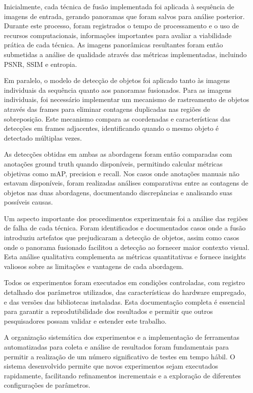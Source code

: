 Inicialmente, cada técnica de fusão implementada foi aplicada à sequência de imagens de entrada, gerando panoramas que foram salvos para análise posterior. Durante este processo, foram registrados o tempo de processamento e o uso de recursos computacionais, informações importantes para avaliar a viabilidade prática de cada técnica. As imagens panorâmicas resultantes foram então submetidas a análise de qualidade através das métricas implementadas, incluindo PSNR, SSIM e entropia.

Em paralelo, o modelo de detecção de objetos foi aplicado tanto às imagens individuais da sequência quanto aos panoramas fusionados. Para as imagens individuais, foi necessário implementar um mecanismo de rastreamento de objetos através das frames para eliminar contagens duplicadas nas regiões de sobreposição. Este mecanismo compara as coordenadas e características das detecções em frames adjacentes, identificando quando o mesmo objeto é detectado múltiplas vezes.

As detecções obtidas em ambas as abordagens foram então comparadas com anotações ground truth quando disponíveis, permitindo calcular métricas objetivas como mAP, precision e recall. Nos casos onde anotações manuais não estavam disponíveis, foram realizadas análises comparativas entre as contagens de objetos nas duas abordagens, documentando discrepâncias e analisando suas possíveis causas.

Um aspecto importante dos procedimentos experimentais foi a análise das regiões de falha de cada técnica. Foram identificados e documentados casos onde a fusão introduziu artefatos que prejudicaram a detecção de objetos, assim como casos onde o panorama fusionado facilitou a detecção ao fornecer maior contexto visual. Esta análise qualitativa complementa as métricas quantitativas e fornece insights valiosos sobre as limitações e vantagens de cada abordagem.

Todos os experimentos foram executados em condições controladas, com registro detalhado dos parâmetros utilizados, das características do hardware empregado, e das versões das bibliotecas instaladas. Esta documentação completa é essencial para garantir a reprodutibilidade dos resultados e permitir que outros pesquisadores possam validar e estender este trabalho.

A organização sistemática dos experimentos e a implementação de ferramentas automatizadas para coleta e análise de resultados foram fundamentais para permitir a realização de um número significativo de testes em tempo hábil. O sistema desenvolvido permite que novos experimentos sejam executados rapidamente, facilitando refinamentos incrementais e a exploração de diferentes configurações de parâmetros.

